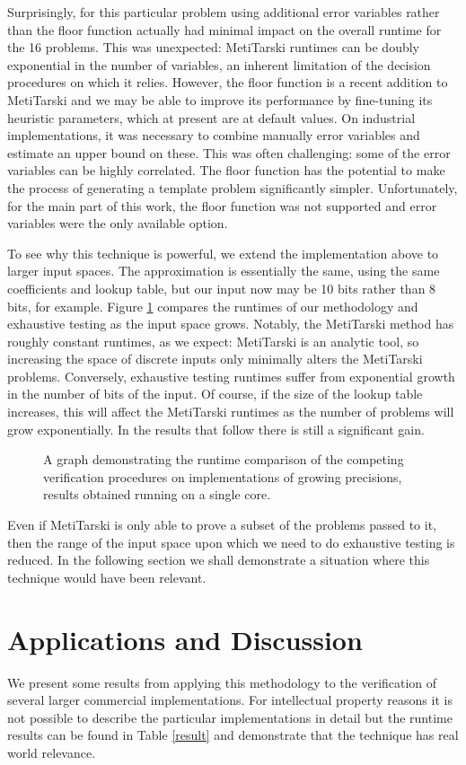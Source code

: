\documentclass[a4paper]{article}
\begin{document}
Surprisingly, for this particular problem using additional error variables rather than the floor function actually had minimal impact on the overall runtime for the 16 problems. This was unexpected: MetiTarski runtimes can be doubly exponential in the number of variables, an inherent limitation of the decision procedures on which it relies. However, the floor function is a recent addition to MetiTarski and we may be able to improve its performance by fine-tuning its heuristic parameters, which at present are at default values. On industrial implementations, it was necessary to combine manually error variables and estimate an upper bound on these. This was often challenging: some of the error variables can be highly correlated. The floor function has the potential to make the process of generating a template problem significantly simpler. Unfortunately, for the main part of this work, the floor function was not supported and error variables were the only available option.

To see why this technique is powerful, we extend the implementation above to larger input spaces. The approximation is essentially the same, using the same coefficients and lookup table, but our input now may be 10 bits rather than 8 bits, for example. Figure \ref{runtime_graph} compares the runtimes of our methodology and exhaustive testing as the input space grows. Notably, the MetiTarski method has roughly constant runtimes, as we expect: MetiTarski is an analytic tool, so increasing the space of discrete inputs only minimally alters the MetiTarski problems. Conversely, exhaustive testing runtimes suffer from exponential growth in the number of bits of the input. Of course, if the size of the lookup table increases, this will affect the MetiTarski runtimes as the number of problems will grow exponentially. In the results that follow there is still a significant gain.
\begin{figure}
\centering

\caption{A graph demonstrating the runtime comparison of the competing verification procedures on implementations of growing precisions, results obtained running on a single core. \label{runtime_graph}
}
\end{figure}
Even if MetiTarski is only able to prove a subset of the problems passed to it, then the range of the input space upon which we need to do exhaustive testing is reduced. In the following section we shall demonstrate a situation where this technique would have been relevant. 

\section{Applications and Discussion}
We present some results from applying this methodology to the verification of several larger commercial implementations. For intellectual property reasons it is not possible to describe the particular implementations in detail but the runtime results can be found in Table \ref{result} and demonstrate that the technique has real world relevance. 
\end{document}
